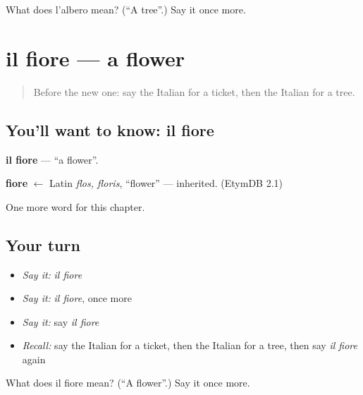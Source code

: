 \begin{tcolorbox}[breakable,colback=teal!4,colframe=teal!35!black,title={Before you move on}]
What does l'albero mean? (\textquotedblleft{}A tree\textquotedblright{}.) Say it once more.
\end{tcolorbox}
\section[il fiore]{il fiore — a flower}

\label{lesson:IT-C64-fiore}



\begin{quote}
Before the new one: say the Italian for a ticket, then the Italian for a tree.
\end{quote}

\subsection*{You'll want to know: il fiore}
\textbf{il fiore} — \textquotedblleft{}a flower\textquotedblright{}.

\begin{cousinweb}
\textbf{fiore} $\leftarrow$ Latin \emph{flos, floris}, \textquotedblleft{}flower\textquotedblright{} — inherited. (EtymDB 2.1)
\end{cousinweb}

\begin{grammarlens}[title={What you've built}]
One more word for this chapter.
\end{grammarlens}

\subsection*{Your turn}
\begin{itemize}
\raggedright
  \item \emph{Say it:} \emph{il fiore}
  \item \emph{Say it:} \emph{il fiore}, once more
  \item \emph{Say it:} say \emph{il fiore}
  \item \emph{Recall:} say the Italian for a ticket, then the Italian for a tree, then say \emph{il fiore} again
\end{itemize}

\begin{tcolorbox}[breakable,colback=teal!4,colframe=teal!35!black,title={Before you move on}]
What does il fiore mean? (\textquotedblleft{}A flower\textquotedblright{}.) Say it once more.
\end{tcolorbox}
